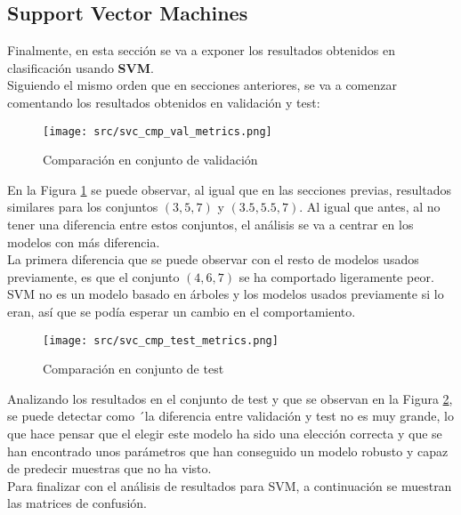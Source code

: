 \subsection{Support Vector Machines}
Finalmente, en esta sección se va a exponer los resultados obtenidos en clasificación usando \textbf{SVM}.\\
\linebreak
Siguiendo el mismo orden que en secciones anteriores, se va a comenzar comentando los resultados obtenidos en validación y test:
\begin{figure}[H]
	\centering
	\texttt{[image: src/svc\_cmp\_val\_metrics.png]}
	\caption{Comparación en conjunto de validación}
	\label{fig:svc_class_cmp_val}
\end{figure}
En la Figura \ref{fig:svc_class_cmp_val} se puede observar, al igual que en las secciones previas, resultados similares para los conjuntos $(3,5,7)$ y $(3.5,5.5,7)$. Al igual que antes, al no tener una diferencia entre estos conjuntos, el análisis se va a centrar en los modelos con más diferencia.\\
\linebreak
La primera diferencia que se puede observar con el resto de modelos usados previamente, es que el conjunto $(4,6,7)$ se ha comportado ligeramente peor. \\
SVM no es un modelo basado en árboles y los modelos usados previamente si lo eran, así que se podía esperar un cambio en el comportamiento.
\begin{figure}[H]
	\centering
	\texttt{[image: src/svc\_cmp\_test\_metrics.png]}
	\caption{Comparación en conjunto de test}
	\label{fig:svc_class_cmp_test}
\end{figure}
Analizando los resultados en el conjunto de test y que se observan en la Figura \ref{fig:svc_class_cmp_test}, se puede detectar como ´la diferencia entre validación y test no es muy grande, lo que hace pensar que el elegir este modelo ha sido una elección correcta y que se han encontrado unos parámetros que han conseguido un modelo robusto y capaz de predecir muestras que no ha visto.\\
\linebreak
Para finalizar con el análisis de resultados para SVM, a continuación se muestran las matrices de confusión.
\clearpage
